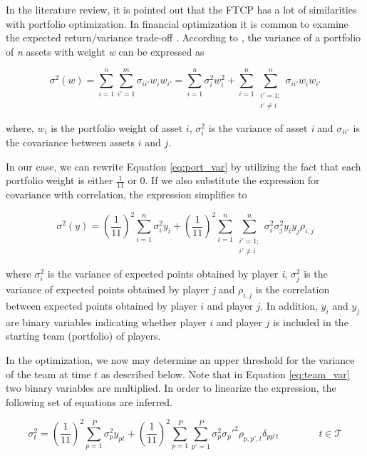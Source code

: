 In the literature review, it is pointed out that the FTCP has a lot of similarities with portfolio optimization. In financial optimization it is common to examine the expected return/variance trade-off \citep{Markowitz}. According to \cite{Zenios}, the variance of a portfolio of \textit{n} assets with weight \textit{w} can be expressed as 

\begin{equation}
    \sigma^2(w) = \sum_{i = 1}^{n}\sum_{i' = 1}^{m}\sigma_{ii'}w_iw_{i'} = \sum_{i = 1}^{n}\sigma_{i}^2w_i^2 + \sum_{i = 1}^{n}\sum_{\substack{i' = 1;\\ i' \neq i}}^{n}\sigma_{ii'}w_iw_{i'}
    \label{eq:port_var}
\end{equation}

where, $w_i$ is the portfolio weight of asset $i$, $\sigma_{i}^2$ is the variance of asset \textit{i} and $\sigma_{ii'}$ is the covariance between assets $i$ and $j$. \newpar

In our case, we can rewrite Equation \ref{eq:port_var} by utilizing the fact that each portfolio weight is either $\frac{1}{11}$ or $0$. If we also substitute the expression for covariance with correlation, the expression simplifies to

\begin{equation}
    \sigma^2(y) = (\frac{1}{11})^2\sum_{i = 1}^{n}\sigma_i^2y_i + (\frac{1}{11})^2\sum_{i = 1}^{n}\sum_{\substack{i' = 1;\\ i' \neq i}}^{n} \sigma_i^2\sigma_j^2y_iy_j\rho_{i,j}
    \label{eq:team_var}
\end{equation}

where $\sigma_{i}^2$ is the variance of expected points obtained by player \textit{i}, $\sigma_{j}^2$ is the variance of expected points obtained by player \textit{j} and $\rho_{i,j}$ is the correlation between expected points obtained by player $i$ and player $j$. In addition, $y_i$ and $y_j$ are binary variables indicating whether player $i$ and player $j$ is included in the starting team (portfolio) of players.\newline

In the optimization, we now may determine an upper threshold for the variance of the team at time $t$ as described below. Note that in Equation \ref{eq:team_var} two binary variables are multiplied. In order to linearize the expression, the following set of equations are inferred.

\begin{equation}
    \sigma^2_{t} = (\frac{1}{11})^2\sum_{p = 1}^{P}\sigma_p^2 y_{pt} + (\frac{1}{11})^2\sum_{p = 1}^{P}\sum_{p' = 1}^{P} \sigma_p^2\sigma_p'^2\rho_{p,p',t} \delta_{pp't} \qquad\qquad t \in \mathcal{T}
\end{equation}

